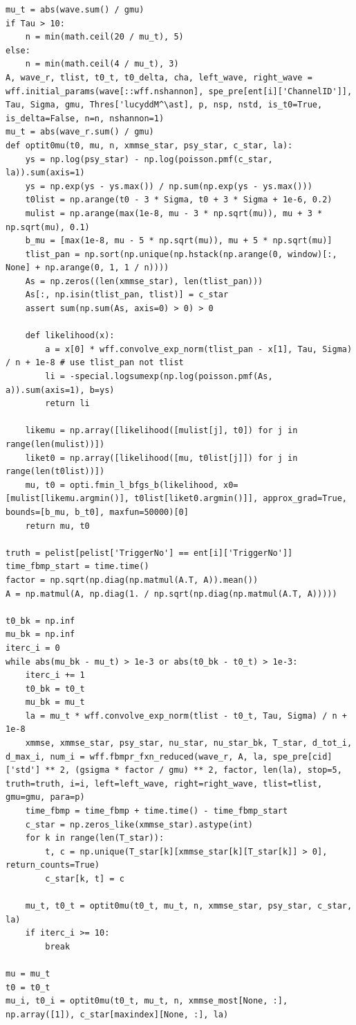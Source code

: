 \documentclass[notitlepage]{article}
\begin{document}
\begin{lstlisting}
mu_t = abs(wave.sum() / gmu)
if Tau > 10:
    n = min(math.ceil(20 / mu_t), 5)
else:
    n = min(math.ceil(4 / mu_t), 3)
A, wave_r, tlist, t0_t, t0_delta, cha, left_wave, right_wave = wff.initial_params(wave[::wff.nshannon], spe_pre[ent[i]['ChannelID']], Tau, Sigma, gmu, Thres['lucyddM^\ast], p, nsp, nstd, is_t0=True, is_delta=False, n=n, nshannon=1)
mu_t = abs(wave_r.sum() / gmu)
def optit0mu(t0, mu, n, xmmse_star, psy_star, c_star, la):
    ys = np.log(psy_star) - np.log(poisson.pmf(c_star, la)).sum(axis=1)
    ys = np.exp(ys - ys.max()) / np.sum(np.exp(ys - ys.max()))
    t0list = np.arange(t0 - 3 * Sigma, t0 + 3 * Sigma + 1e-6, 0.2)
    mulist = np.arange(max(1e-8, mu - 3 * np.sqrt(mu)), mu + 3 * np.sqrt(mu), 0.1)
    b_mu = [max(1e-8, mu - 5 * np.sqrt(mu)), mu + 5 * np.sqrt(mu)]
    tlist_pan = np.sort(np.unique(np.hstack(np.arange(0, window)[:, None] + np.arange(0, 1, 1 / n))))
    As = np.zeros((len(xmmse_star), len(tlist_pan)))
    As[:, np.isin(tlist_pan, tlist)] = c_star
    assert sum(np.sum(As, axis=0) > 0) > 0

    def likelihood(x):
        a = x[0] * wff.convolve_exp_norm(tlist_pan - x[1], Tau, Sigma) / n + 1e-8 # use tlist_pan not tlist
        li = -special.logsumexp(np.log(poisson.pmf(As, a)).sum(axis=1), b=ys)
        return li

    likemu = np.array([likelihood([mulist[j], t0]) for j in range(len(mulist))])
    liket0 = np.array([likelihood([mu, t0list[j]]) for j in range(len(t0list))])
    mu, t0 = opti.fmin_l_bfgs_b(likelihood, x0=[mulist[likemu.argmin()], t0list[liket0.argmin()]], approx_grad=True, bounds=[b_mu, b_t0], maxfun=50000)[0]
    return mu, t0

truth = pelist[pelist['TriggerNo'] == ent[i]['TriggerNo']]
time_fbmp_start = time.time()
factor = np.sqrt(np.diag(np.matmul(A.T, A)).mean())
A = np.matmul(A, np.diag(1. / np.sqrt(np.diag(np.matmul(A.T, A)))))

t0_bk = np.inf
mu_bk = np.inf
iterc_i = 0
while abs(mu_bk - mu_t) > 1e-3 or abs(t0_bk - t0_t) > 1e-3:
    iterc_i += 1
    t0_bk = t0_t
    mu_bk = mu_t
    la = mu_t * wff.convolve_exp_norm(tlist - t0_t, Tau, Sigma) / n + 1e-8
    xmmse, xmmse_star, psy_star, nu_star, nu_star_bk, T_star, d_tot_i, d_max_i, num_i = wff.fbmpr_fxn_reduced(wave_r, A, la, spe_pre[cid]['std'] ** 2, (gsigma * factor / gmu) ** 2, factor, len(la), stop=5, truth=truth, i=i, left=left_wave, right=right_wave, tlist=tlist, gmu=gmu, para=p)
    time_fbmp = time_fbmp + time.time() - time_fbmp_start
    c_star = np.zeros_like(xmmse_star).astype(int)
    for k in range(len(T_star)):
        t, c = np.unique(T_star[k][xmmse_star[k][T_star[k]] > 0], return_counts=True)
        c_star[k, t] = c

    mu_t, t0_t = optit0mu(t0_t, mu_t, n, xmmse_star, psy_star, c_star, la)
    if iterc_i >= 10:
        break

mu = mu_t
t0 = t0_t
mu_i, t0_i = optit0mu(t0_t, mu_t, n, xmmse_most[None, :], np.array([1]), c_star[maxindex][None, :], la)
\end{lstlisting}
\end{document}
